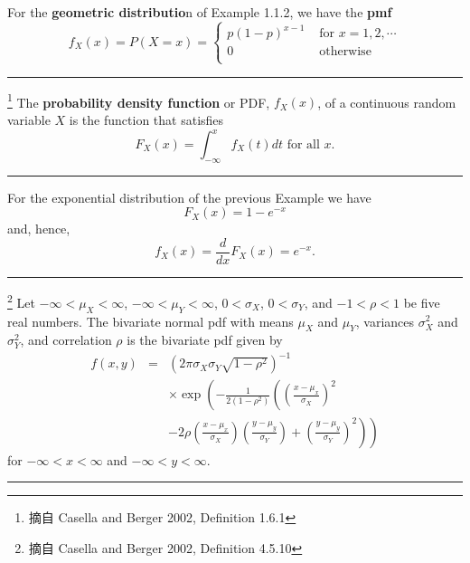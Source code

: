 \begin{ex} %
For the \textbf{geometric distributio}n of Example 1.1.2, we have the \textbf{pmf}
\[f_X(x)=P(X=x)=\left\{\begin{array}{ll} p(1-p)^{x-1}  & \mbox{ for } x=1, 2, \cdots \\
                                              0        & \mbox{ otherwise } \\ \end{array}\right.\]
\end{ex}
\bigskip
\noindent \rule{\textwidth}{0.2pt}
\begin{de}\footnote{摘自 Casella and Berger 2002, Definition 1.6.1}  %
The \textbf{probability density function} or PDF, $f_X(x)$, of a continuous random variable $X$ is the function that
satisfies
\[F_X(x)=\int_{-\infty}^x f_X(t)dt \mbox{ for all } x.\]
\noindent \rule{\textwidth}{0.2pt}
\end{de}
\bigskip

\begin{ex} %
For the exponential distribution of the previous Example we have
\[F_X(x)=1-e^{-x}\]
and, hence,
\[f_X(x)=\frac{d}{dx}F_X(x)=e^{-x}.\]
\end{ex}
\bigskip

\noindent \rule{\textwidth}{0.2pt}
\begin{de}\footnote{摘自 Casella and Berger 2002, Definition 4.5.10}   %
Let $-\infty<\mu_X<\infty$, $-\infty<\mu_Y<\infty$, $0<\sigma_X$, $0<\sigma_Y$, and
$-1<\rho<1$ be five real numbers.  The bivariate normal pdf with means $\mu_X$ and $\mu_Y$,
variances $\sigma_X^2$ and $\sigma_Y^2$, and correlation $\rho$ is the bivariate pdf given by
\begin{eqnarray*}
f(x,y)&=&\left( 2\pi\sigma_X\sigma_Y\sqrt{1-\rho^2}\right)^{-1}\\
      && \times\exp\left(-\frac{1}{2(1-\rho^2)}\left(\left(\frac{x-\mu_x}{\sigma_X}\right)^2\right.\right.\\
      && \left.\left.-2\rho\left(\frac{x-\mu_x}{\sigma_X}\right)\left(\frac{y-\mu_y}{\sigma_Y}\right)
      +\left(\frac{y-\mu_y}{\sigma_Y}\right)^2 \right)\right)
\end{eqnarray*}
for $-\infty<x<\infty$ and $-\infty<y<\infty$.\\
\noindent \rule{\textwidth}{0.2pt}
\end{de}

